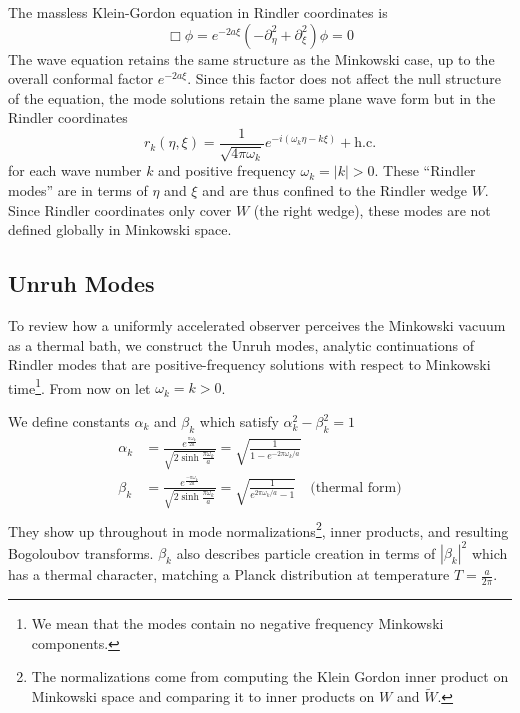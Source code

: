 \documentclass[12pt,a4paper]{article}
\begin{document}
The massless Klein-Gordon equation in Rindler coordinates is
\begin{equation}
  \Box \phi = e^{-2a \xi}(-\partial_\eta^2 + \partial_\xi^2) \phi = 0
\end{equation}
The wave equation retains the same structure as the Minkowski case, up to the overall conformal factor $e^{-2a\xi}$. Since this factor does not affect the null structure of the equation, the mode solutions retain the same plane wave form but in the Rindler coordinates
\begin{equation}
 r_k(\eta,\xi) = \frac{1}{\sqrt{4 \pi \omega_k}} e^{-i(\omega_k \eta -k \xi)} + \text{h.c.}
\end{equation}
for each wave number $k$ and positive frequency $\omega_k = |k| > 0$.  These ``Rindler modes'' are in terms of $\eta$ and $\xi$ and are thus confined to the Rindler wedge $W$.  Since Rindler coordinates only cover $W$ (the right wedge), these modes are not defined globally in Minkowski space.

\subsection{Unruh Modes}
To review how a uniformly accelerated observer perceives the Minkowski vacuum as a thermal bath, we construct the Unruh modes\cite{unruh1976notes}, analytic continuations of Rindler modes that are positive-frequency solutions with respect to Minkowski time\footnote{We mean that the modes contain no negative frequency Minkowski components.}. From now on let $\omega_k = k > 0$.

We define constants $\alpha_k$ and $\beta_k$ which satisfy $\alpha_k^2 - \beta_k^2 = 1$
\begin{equation}
  \begin{aligned}
    \alpha_k &= \frac{e^{\frac{\pi\omega_k}{2a}}}{\sqrt{2 \sinh \frac{\pi \omega_k}{a}}} = \sqrt{\frac{1}{1 - e^{-2\pi\omega_k / a}}}  \\
    \beta_k &= \frac{e^{\frac{-\pi\omega_k}{2a}}}{\sqrt{2 \sinh \frac{\pi \omega_k}{a}}} = \sqrt{\frac{1}{e^{2\pi\omega_k / a} - 1}} \quad \text{(thermal form)} \\
  \end{aligned}
  \label{alpha_beta}
\end{equation}
They show up throughout in mode normalizations\footnote{The normalizations come from computing the Klein Gordon inner product on Minkowski space and comparing it to inner products on $W$ and $\widetilde{W}$.}, inner products, and resulting Bogoloubov transforms. $\beta_k$ also describes particle creation in terms of $|\beta_k|^2$ which has a thermal character, matching a Planck distribution at temperature $T = \frac{a}{2\pi}$.
\end{document}
